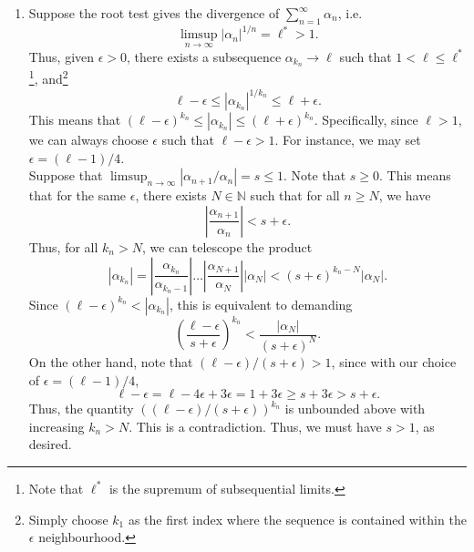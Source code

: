 \documentclass[10pt]{article}
\begin{document}
\begin{enumerate}
                \item Suppose the root test gives the divergence of $\sum_{n = 1}^\infty \alpha_n$, i.e.\ 
                \[
                        \limsup_{n \to \infty}  |\alpha_n|^{1 /n} = \ell^* > 1.
                \]
                Thus, given $\epsilon > 0$, there exists a subsequence $\alpha_{k_n} \to \ell$ such that $1 < \ell \leq \ell^*$\footnote{
                        Note that $\ell^*$ is the supremum of subsequential limits.
                }, and\footnote{Simply choose $k_1$ as the first index where the sequence is contained within the $\epsilon$ neighbourhood.}
                \[
                        \ell - \epsilon \leq |\alpha_{k_n}|^{1 /k_n} \leq \ell + \epsilon.
                \]
                This means that $(\ell - \epsilon)^{k_n}\leq|\alpha_{k_n}| \leq (\ell + \epsilon)^{k_n}$.
                Specifically, since $\ell > 1$, we can always choose $\epsilon$ such that $\ell - \epsilon > 1$.
                For instance, we may set $\epsilon = (\ell - 1) /4$. \\
                
                Suppose that $\limsup_{n \to \infty} |\alpha_{n + 1} /\alpha_n| = s \leq 1$. Note that $s \geq 0$.
                This means that for the same $\epsilon$, there exists $N \in \mathbb{N}$ such that for all $n \geq N$, we have
                \[
                        \left|\frac{\alpha_{n + 1}}{\alpha_n}\right| < s + \epsilon.
                \]
                Thus, for all $k_n > N$, we can telescope the product
                \[
                        |\alpha_{k_n}| = \left| \frac{\alpha_{k_n}}{\alpha_{k_n - 1}} \right|\dots \left| \frac{\alpha_{N + 1}}{\alpha_{N}} \right| 
                                |\alpha_N| < (s + \epsilon)^{k_n - N}|\alpha_N|.
                \]
                Since $(\ell - \epsilon)^{k_n} < |\alpha_{k_n}|$, this is equivalent to demanding
                \[
                        \left(\frac{\ell - \epsilon}{s + \epsilon}\right)^{k_n} < \frac{|\alpha_N|}{(s + \epsilon)^{N}}.
                \]
                On the other hand, note that $(\ell - \epsilon)/(s + \epsilon) > 1$, since with our choice of $\epsilon = (\ell - 1)/4$,
                \[
                        \ell - \epsilon = \ell - 4\epsilon + 3\epsilon = 1 + 3\epsilon \geq s + 3\epsilon > s + \epsilon.
                \]
                Thus, the quantity $((\ell - \epsilon)/(s + \epsilon))^{k_n}$ is unbounded above with increasing $k_n > N$.
                This is a contradiction. Thus, we must have $s > 1$, as desired.
                
        \end{enumerate}
\end{document}
